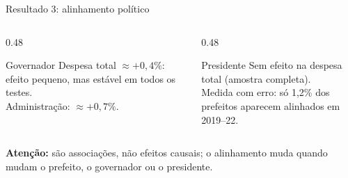 \documentclass[aspectratio=169,9pt]{beamer}
\begin{document}
\begin{frame}{Resultado 3: alinhamento político}
  \begin{columns}[T,onlytextwidth]
    \begin{column}{0.48\textwidth}
      \begin{block}{Governador}
        Despesa total \alert{$\approx +0{,}4\%$}: efeito pequeno, mas estável em todos os testes.\\[0.5em]
        Administração: $\approx +0{,}7\%$.
      \end{block}
    \end{column}
    \hfill
    \begin{column}{0.48\textwidth}
      \begin{block}{Presidente}
        \alert{Sem efeito} na despesa total (amostra completa).\\[0.5em]
        Medida com erro: só 1,2\% dos prefeitos aparecem alinhados em 2019--22.
      \end{block}
    \end{column}
  \end{columns}
  \vspace{1em}
  \textbf{Atenção:} são \alert{associações}, não efeitos causais; o alinhamento muda quando mudam o prefeito, o governador ou o presidente.
\end{frame}
\end{document}
